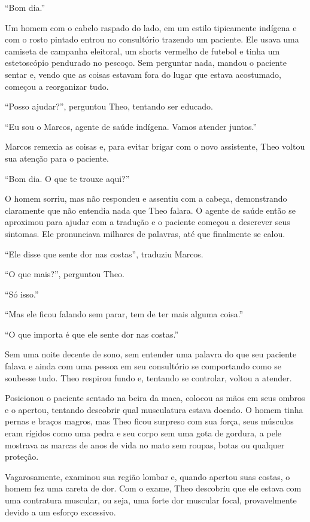 ``Bom dia.''

Um homem com o cabelo raspado do lado, em um estilo tipicamente indígena
e com o rosto pintado entrou no consultório trazendo um paciente. Ele
usava uma camiseta de campanha eleitoral, um shorts vermelho de futebol
e tinha um estetoscópio pendurado no pescoço. Sem perguntar nada, mandou
o paciente sentar e, vendo que as coisas estavam fora do lugar que
estava acostumado, começou a reorganizar tudo.

``Posso ajudar?'', perguntou Theo, tentando ser educado.

``Eu sou o Marcos, agente de saúde indígena. Vamos atender juntos.''

Marcos remexia as coisas e, para evitar brigar com o novo assistente,
Theo voltou sua atenção para o paciente.

``Bom dia. O que te trouxe aqui?''

O homem sorriu, mas não respondeu e assentiu com a cabeça, demonstrando
claramente que não entendia nada que Theo falara. O agente de saúde
então se aproximou para ajudar com a tradução e o paciente começou a
descrever seus sintomas. Ele pronunciava milhares de palavras, até que
finalmente se calou.

``Ele disse que sente dor nas costas'', traduziu Marcos.

``O que mais?'', perguntou Theo.

``Só isso.''

``Mas ele ficou falando sem parar, tem de ter mais alguma coisa.''

``O que importa é que ele sente dor nas costas.''

Sem uma noite decente de sono, sem entender uma palavra do que seu
paciente falava e ainda com uma pessoa em seu consultório se comportando
como se soubesse tudo. Theo respirou fundo e, tentando se controlar,
voltou a atender.

Posicionou o paciente sentado na beira da maca, colocou as mãos em seus
ombros e o apertou, tentando descobrir qual musculatura estava doendo. O
homem tinha pernas e braços magros, mas Theo ficou surpreso com sua
força, seus músculos eram rígidos como uma pedra e seu corpo sem uma
gota de gordura, a pele mostrava as marcas de anos de vida no mato sem
roupas, botas ou qualquer proteção.

Vagarosamente, examinou sua região lombar e, quando apertou suas costas,
o homem fez uma careta de dor. Com o exame, Theo descobriu que ele
estava com uma contratura muscular, ou seja, uma forte dor muscular
focal, provavelmente devido a um esforço excessivo.

